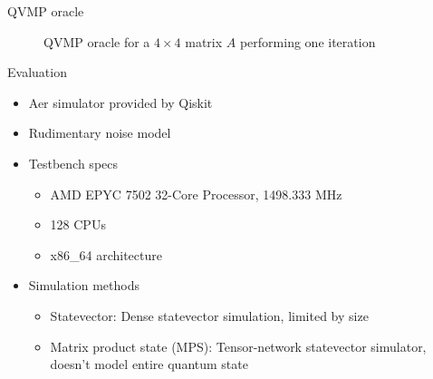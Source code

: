 \documentclass[10pt]{beamer}
\begin{document}
%     


\begin{frame}{QVMP oracle}
  \begin{figure}
    \centering
    \scalebox{0.7}{}
    \caption{QVMP oracle for a $4 \times 4$ matrix $A$ performing one iteration}
    \label{fig:qvmp_oracle}
  \end{figure}
\end{frame}


\begin{frame}{Evaluation}
  \begin{itemize}
    \item Aer simulator provided by Qiskit
    \item Rudimentary noise model
    \item {
        Testbench specs
        \begin{itemize}
          \item AMD EPYC 7502 32-Core Processor, 1498.333 MHz
          \item 128 CPUs
          \item x86\_64 architecture
        \end{itemize}
    }
    \item {
        Simulation methods
        \begin{itemize}
          \item Statevector: Dense statevector simulation, limited by size
          \item Matrix product state (MPS): Tensor-network statevector simulator,
            doesn't model entire quantum state
        \end{itemize}
    }
  \end{itemize}
\end{frame}
\end{document}
